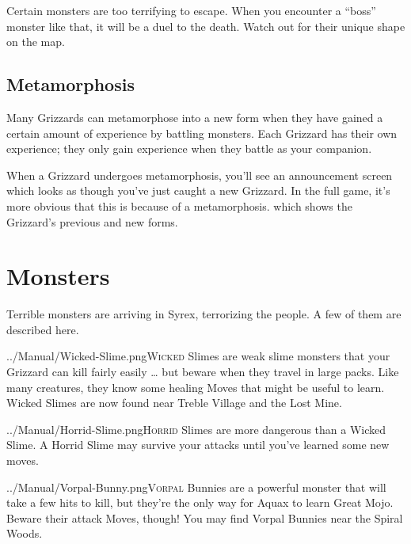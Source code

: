\documentclass[10pt,twocolumn,openany,article]{memoir}
\begin{document}
Certain  monsters  are too  terrifying  to  escape. When  you  encounter
a ``boss'' monster like that, it will  be a duel to the death. Watch out
for their unique shape on the map.

\section{Metamorphosis}

Many Grizzards  can metamorphose into a  new form when they  have gained
a certain amount  of experience by battling monsters.  Each Grizzard has
their  own experience;  they only  gain experience  when they  battle as
your companion.

When  a Grizzard  undergoes  metamorphosis, you'll  see an  announcement
screen  \ifdefined\DEMO  which  looks   as  though  you've  just  caught
a new Grizzard. In the full game, it's more obvious that this is because
of  a  metamorphosis. \else  which  shows  the Grizzard's  previous  and
new forms. \fi

\columnbreak
\chapter{Monsters}

Terrible monsters are  arriving in Syrex, terrorizing the  people. A few
of them are described here.

\vspace{14pt}

\lettrine[image=true,                lines=5,               findent=3pt,
nindent=3pt]{../Manual/Wicked-Slime.png}{Wicked}  Slimes are  weak slime
monsters that  your Grizzard can  kill fairly  easily … but  beware when
they travel in large packs. Like  many creatures, they know some healing
Moves that  might be useful to  learn. Wicked Slimes are  now found near
Treble Village and the Lost Mine.

\vspace{14pt}

\lettrine[image=true,                lines=5,               findent=3pt,
nindent=3pt]{../Manual/Horrid-Slime.png}{Horrid}    Slimes   are    more
dangerous than a  Wicked Slime. A Horrid Slime may  survive your attacks
until you've learned some new moves.

\vspace{14pt}

\lettrine[image=true,                lines=5,               findent=3pt,
nindent=3pt]{../Manual/Vorpal-Bunny.png}{Vorpal} Bunnies  are a powerful
monster that will take a few hits  to kill, but they're the only way for
Aquax to  learn Great Mojo. Beware  their attack Moves, though!  You may
find Vorpal Bunnies near the Spiral Woods.
\end{document}
